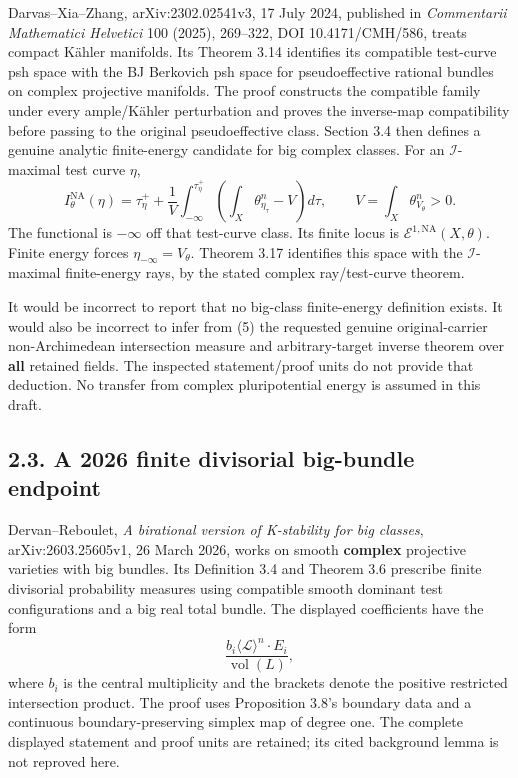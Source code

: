 \documentclass[
  10pt,
]{article}
\begin{document}
Darvas--Xia--Zhang, arXiv:2302.02541v3, 17 July 2024, published in
\emph{Commentarii Mathematici Helvetici} 100 (2025), 269--322, DOI
10.4171/CMH/586, treats compact Kähler manifolds. Its Theorem 3.14
identifies its compatible test-curve psh space with the BJ Berkovich psh
space for pseudoeffective rational bundles on complex projective
manifolds. The proof constructs the compatible family under every
ample/Kähler perturbation and proves the inverse-map compatibility
before passing to the original pseudoeffective class. Section 3.4 then
defines a genuine analytic finite-energy candidate for big complex
classes. For an \(\mathcal I\)-maximal test curve \(\eta\), \[
 I^{\mathrm{NA}}_\theta(\eta)=\tau^+_\eta+
 \frac1{V}\int_{-\infty}^{\tau^+_\eta}
       \left(\int_X\theta_{\eta_\tau}^n-V\right)d\tau,
 \qquad V=\int_X\theta_{V_\theta}^n>0.
 \tag{5}
\] The functional is \(-\infty\) off that test-curve class. Its finite
locus is \(\mathcal E^{1,\mathrm{NA}}(X,\theta)\). Finite energy forces
\(\eta_{-\infty}=V_\theta\). Theorem 3.17 identifies this space with the
\(\mathcal I\)-maximal finite-energy rays, by the stated complex
ray/test-curve theorem.

It would be incorrect to report that no big-class finite-energy
definition exists. It would also be incorrect to infer from (5) the
requested genuine original-carrier non-Archimedean intersection measure
and arbitrary-target inverse theorem over \textbf{all} retained fields.
The inspected statement/proof units do not provide that deduction. No
transfer from complex pluripotential energy is assumed in this draft.

\subsection{2.3. A 2026 finite divisorial big-bundle
endpoint}\label{a-2026-finite-divisorial-big-bundle-endpoint}

Dervan--Reboulet, \emph{A birational version of K-stability for big
classes}, arXiv:2603.25605v1, 26 March 2026, works on smooth
\textbf{complex} projective varieties with big bundles. Its Definition
3.4 and Theorem 3.6 prescribe finite divisorial probability measures
using compatible smooth dominant test configurations and a big real
total bundle. The displayed coefficients have the form \[
 \frac{b_i\langle\mathcal L\rangle^n\cdot E_i}{\operatorname{vol}(L)},
 \tag{6}
\] where \(b_i\) is the central multiplicity and the brackets denote the
positive restricted intersection product. The proof uses Proposition
3.8's boundary data and a continuous boundary-preserving simplex map of
degree one. The complete displayed statement and proof units are
retained; its cited background lemma is not reproved here.
\end{document}
